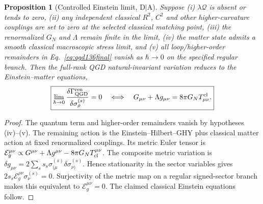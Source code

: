 \documentclass[11pt,a4paper]{article}
\newtheorem{proposition}[theorem]{Proposition}
\begin{document}
\begin{proposition}[Controlled Einstein limit, D$\mid$A]\label{prop:qgd136limit}
Suppose (i) $\lambda\mathcal Q$ is absent or tends to zero,
(ii) any independent classical $R^2$, $C^2$ and other higher-curvature
couplings are set to zero at the selected classical matching point,
(iii) the renormalized $G_N$ and $\Lambda$ remain finite in the limit,
(iv) the matter state admits a smooth classical macroscopic stress
limit, and (v) all loop/higher-order remainders in
Eq.~\eqref{eq:qgd136final} vanish as $\hbar\to0$ on the specified
regular branch. Then the full-rank QGD natural-invariant variation
reduces to the Einstein--matter equations,
\begin{equation}\label{eq:qgd136limit}
\boxed{\lim_{\hbar\to0}\frac{\delta\Gamma_{\rm QGD}^{\rm ren}}
 {\delta\sigma^{(s)}_\rho}=0
\quad\Longleftrightarrow\quad
G_{\mu\nu}+\Lambda g_{\mu\nu}=8\pi G_NT_{\mu\nu}^{\rm cl}.}
\end{equation}
\end{proposition}
\begin{proof}
The quantum term and higher-order remainders vanish by hypotheses
(iv)--(v). The remaining action is the Einstein--Hilbert--GHY plus
classical matter action at fixed renormalized couplings. Its metric
Euler tensor is $\mathcal E_g^{\mu\nu}\propto
G^{\mu\nu}+\Lambda g^{\mu\nu}-8\pi G_NT_{\rm cl}^{\mu\nu}$.
The composite metric variation is
$\delta g_{\mu\nu}=2\sum_ss_s\sigma_{(\mu}^{(s)}
\delta\sigma_{\nu)}^{(s)}$. Hence stationarity in the sector
variables gives $2s_s\mathcal E_g^{\rho\nu}\sigma_\nu^{(s)}=0$.
Surjectivity of the metric map on a regular signed-sector branch makes
this equivalent to $\mathcal E_g^{\mu\nu}=0$. The claimed classical
Einstein equations follow.
\end{proof}
\end{document}
